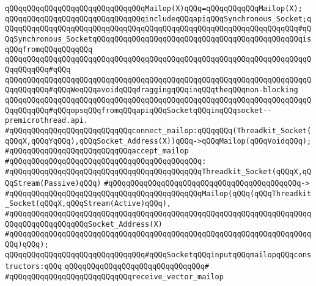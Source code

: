 \verb|qQQqqQQqqQQqqQQqqQQqqQQqqQQqqQQqMailop(X)qQQq=qQQqqQQqqQQqMailop(X);|\newline
\newline
\verb|qQQqqQQqqQQqqQQqqQQqqQQqqQQqqQQqincludeqQQqapiqQQqSynchronous_Socket;qQQqqQQqqQQqqQQqqQQqqQQqqQQqqQQqqQQqqQQqqQQqqQQqqQQqqQQqqQQqqQQqqQQq#qQQqSynchronous_SocketqQQqqQQqqQQqqQQqqQQqqQQqqQQqqQQqqQQqqQQqqQQqqQQqisqQQqfromqQQqqQQqqQQq|\newline
\verb|qQQqqQQqqQQqqQQqqQQqqQQqqQQqqQQqqQQqqQQqqQQqqQQqqQQqqQQqqQQqqQQqqQQqqQQqqQQqqQQq#qQQq|\newline
\verb|qQQqqQQqqQQqqQQqqQQqqQQqqQQqqQQqqQQqqQQqqQQqqQQqqQQqqQQqqQQqqQQqqQQqqQQqqQQqqQQq#qQQqWeqQQqavoidqQQqdraggingqQQqinqQQqtheqQQqnon-blocking|\newline
\verb|qQQqqQQqqQQqqQQqqQQqqQQqqQQqqQQqqQQqqQQqqQQqqQQqqQQqqQQqqQQqqQQqqQQqqQQqqQQqqQQq#qQQqopsqQQqfromqQQqapiqQQqSocketqQQqinqQQqsocket--premicrothread.api.|\newline
\newline
\verb|#qQQqqQQqqQQqqQQqqQQqqQQqqQQqconnect_mailop:qQQqqQQq(Threadkit_Socket(qQQqX,qQQqYqQQq),qQQqSocket_Address(X))qQQq->qQQqMailop(qQQqVoidqQQq);|\newline
\newline
\verb|#qQQqqQQqqQQqqQQqqQQqqQQqqQQqaccept_mailop|\newline
\verb|#qQQqqQQqqQQqqQQqqQQqqQQqqQQqqQQqqQQqqQQqqQQq:|\newline
\verb|#qQQqqQQqqQQqqQQqqQQqqQQqqQQqqQQqqQQqqQQqqQQqThreadkit_Socket(qQQqX,qQQqStream(Passive)qQQq)|\newline
\verb|#qQQqqQQqqQQqqQQqqQQqqQQqqQQqqQQqqQQqqQQqqQQq->|\newline
\verb|#qQQqqQQqqQQqqQQqqQQqqQQqqQQqqQQqqQQqqQQqqQQqMailop(qQQq(qQQqThreadkit_Socket(qQQqX,qQQqStream(Active)qQQq),|\newline
\verb|#qQQqqQQqqQQqqQQqqQQqqQQqqQQqqQQqqQQqqQQqqQQqqQQqqQQqqQQqqQQqqQQqqQQqqQQqqQQqqQQqqQQqqQQqSocket_Address(X)|\newline
\verb|#qQQqqQQqqQQqqQQqqQQqqQQqqQQqqQQqqQQqqQQqqQQqqQQqqQQqqQQqqQQqqQQqqQQqqQQq)qQQq);|\newline
\newline
\verb|qQQqqQQqqQQqqQQqqQQqqQQqqQQqqQQq#qQQqSocketqQQqinputqQQqmailopqQQqconstructors:qQQq|\newline
\verb|qQQqqQQqqQQqqQQqqQQqqQQqqQQqqQQq#|\newline
\verb|#qQQqqQQqqQQqqQQqqQQqqQQqqQQqreceive_vector_mailop|\newline
